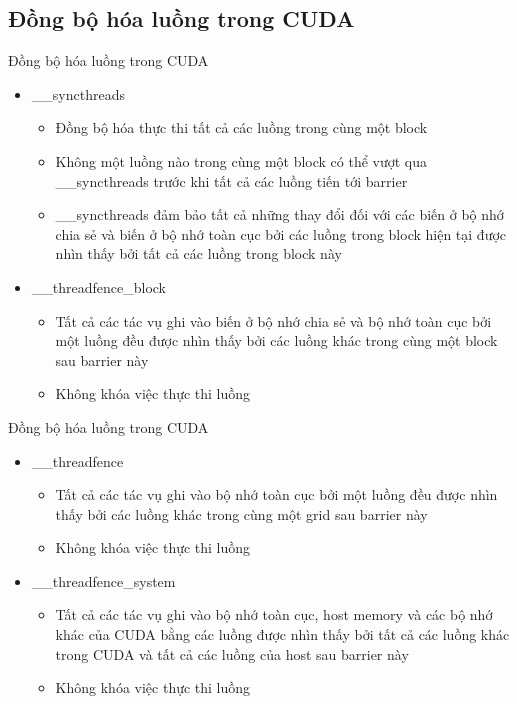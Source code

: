 \documentclass[10pt]{beamer}
\theoremstyle{remark}
\numberwithin{algocf}{section}
\numberwithin{equation}{section}
\numberwithin{dl}{section}
\numberwithin{figure}{section}
\begin{document}
\subsection{Đồng bộ hóa luồng trong CUDA}

\begin{frame}{Đồng bộ hóa luồng trong CUDA}
    \begin{itemize}
        \item \_\_syncthreads
        \begin{itemize}
            \item Đồng bộ hóa thực thi tất cả các luồng trong cùng một block
            \item Không một luồng nào trong cùng một block có thể vượt qua \_\_syncthreads trước khi tất cả các luồng tiến tới barrier 
            \item \_\_syncthreads đảm bảo tất cả những thay đổi đối với các biến ở bộ nhớ chia sẻ và biến ở bộ nhớ toàn cục bởi các luồng trong block hiện tại được nhìn thấy bởi tất cả các luồng trong block này
        \end{itemize}
        \item \_\_threadfence\_block
        \begin{itemize}
            \item Tất cả các tác vụ ghi vào biến ở bộ nhớ chia sẻ và bộ nhớ toàn cục bởi một luồng đều được nhìn thấy bởi các luồng khác trong cùng một block sau barrier này
            \item Không khóa việc thực thi luồng
        \end{itemize}
    \end{itemize}
\end{frame}

\begin{frame}{Đồng bộ hóa luồng trong CUDA}
    \begin{itemize}
        \item \_\_threadfence
        \begin{itemize}
            \item Tất cả các tác vụ ghi vào bộ nhớ toàn cục bởi một luồng đều được nhìn thấy bởi các luồng khác trong cùng một grid sau barrier này
            \item Không khóa việc thực thi luồng
        \end{itemize}
        \item \_\_threadfence\_system
        \begin{itemize}
            \item Tất cả các tác vụ ghi vào bộ nhớ toàn cục, host memory và các bộ nhớ khác của CUDA bằng các luồng được nhìn thấy bởi tất cả các luồng khác trong CUDA và tất cả các luồng của host sau barrier này 
            \item Không khóa việc thực thi luồng
        \end{itemize}
    \end{itemize}
\end{frame}
\end{document}
